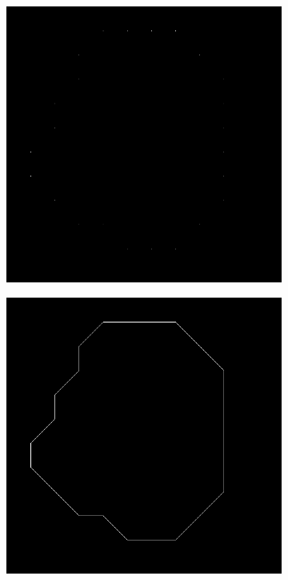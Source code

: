 \begin{figure}[h!]
\begin{subfigure}[b]{0.4\linewidth}
		\caption{}
		\label{fig:10longchain}
	\end{subfigure}
	\begin{subfigure}[b]{0.4\linewidth}
		\includegraphics[width=\linewidth]{myfigure/p10/10_highlight_grid.png}
		\caption{}
		\label{fig:highlightgrid}
	\end{subfigure}
	\begin{subfigure}[b]{0.4\linewidth}
		\includegraphics[width=\linewidth]{myfigure/p10/10_straight_border.png}
		\caption{}
		\label{fig:straightborder}
	\end{subfigure}
	

\end{figure}
